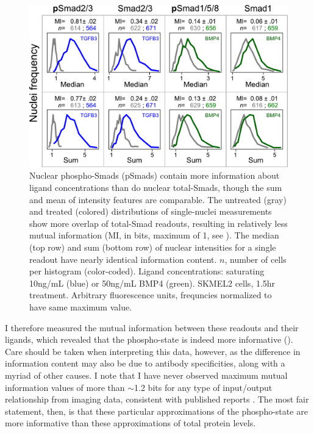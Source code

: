   \begin{figure}[!bt]
  \centering
  \includegraphics[width=5.5in]{FIGS/insulation/readoutInformation+.pdf}
  {\singlespacing 
  \caption[Information content of Smad readouts.]
        { Nuclear phospho-Smads (pSmads) contain more information about
          ligand concentrations than do nuclear total-Smads,
          though the sum and mean of intensity features are comparable. The
          untreated (gray) and treated (colored) distributions
          of single-nuclei measurements show more overlap
          of total-Smad readouts, resulting in relatively less mutual
          information (MI, in bits, maximum of 1, see ).
          The median (top row) and
          sum (bottom row) of nuclear intensities for a single readout
          have nearly identical information content.
          $n$, number of cells
          per histogram (color-coded). 
          Ligand concentrations: saturating 10ng/mL
           (blue) or 50ng/mL BMP4 (green).
          SKMEL2 cells, 1.5hr treatment. Arbitrary fluorescence units,
          frequncies normalized to have same maximum value.}
  \label{fig:insulation:readoutInformation}}
  \end{figure}


I therefore measured the mutual information
between these readouts and their ligands, which
revealed that the phospho-state is indeed more informative
(). Care should be taken when
interpreting this data, however, as the difference in information content
may also be due to antibody specificities, along with a myriad of
other causes. I note that
I have never observed maximum mutual information values of more than $\sim$1.2 bits
for any type of input/output relationship from imaging data, consistent
with published reports \cite{Cheong2011}.
The most fair statement, then, is that these particular approximations
of the phospho-state are more informative than these approximations of
total protein levels.


